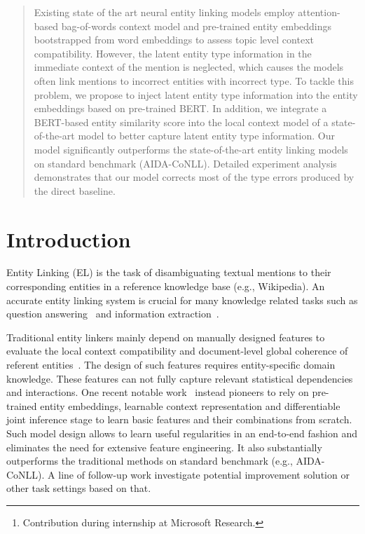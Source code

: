 \documentclass[letterpaper]{article} \usepackage{aaai20}  \usepackage{times}  \usepackage{helvet} \usepackage{courier}  \usepackage[hyphens]{url}  \usepackage{graphicx} \urlstyle{rm} \def\UrlFont{\rm}  \usepackage{graphicx}  \frenchspacing  \setlength{\pdfpagewidth}{8.5in}  \setlength{\pdfpageheight}{11in}  \usepackage{multirow}
\author{Shuang Chen,\textsuperscript{\rm 1}\thanks{Contribution during internship at Microsoft Research.} 
    Jinpeng Wang,\textsuperscript{\rm 2} 
    Feng Jiang,\textsuperscript{\rm 1,3}
    Chin-Yew Lin\textsuperscript{\rm 2} \\
    \textsuperscript{\rm 1} Harbin Institute of Technology, Harbin, China \\
    \textsuperscript{\rm 2} Microsoft Research Asia ~~~~\
    \textsuperscript{\rm 3} Peng Cheng Laboratory \\
    hitercs@gmail.com, \{jinpwa, cyl\}@microsoft.com, fjiang@hit.edu.cn
}
\begin{document}
\maketitle

\begin{abstract}
    Existing state of the art neural entity linking models employ attention-based bag-of-words context model and pre-trained entity embeddings bootstrapped from word embeddings to assess topic level context compatibility. However, the latent entity type information in the immediate context of the mention is neglected, which causes the models often link mentions to incorrect entities with incorrect type. To tackle this problem, we propose to inject latent entity type information into the entity embeddings based on pre-trained BERT. In addition, we integrate a BERT-based entity similarity score into the local context model of a state-of-the-art model to better capture latent entity type information. Our model significantly outperforms the state-of-the-art entity linking models on standard benchmark (AIDA-CoNLL). Detailed experiment analysis demonstrates that our model corrects most of the type errors produced by the direct baseline.
\end{abstract}

\section{Introduction}
Entity Linking (EL) is the task of disambiguating textual mentions to their corresponding entities in a reference knowledge base (e.g., Wikipedia). An accurate entity linking system is crucial for many knowledge related tasks such as question answering~\cite{yih-etal-2015-semantic} and information extraction~\cite{hoffmann-etal-2011-knowledge}.

Traditional entity linkers mainly depend on manually designed features to evaluate the local context compatibility and document-level global coherence of referent entities~\cite{cheng-roth-2013-relational,durrett-klein-2014-joint}. 
The design of such features requires entity-specific domain knowledge. These features can not fully capture relevant statistical dependencies and interactions. 
One recent notable work~\cite{ganea2017deep} instead pioneers to rely on pre-trained entity embeddings, learnable context representation and differentiable joint inference stage to learn basic features and their combinations from scratch. Such model design allows to learn useful regularities in an end-to-end fashion and eliminates the need for extensive feature engineering.
It also substantially outperforms the traditional methods on standard benchmark (e.g., AIDA-CoNLL).
A line of follow-up work \cite{le-titov-2018-improving,le-titov-2019-boosting,le-titov-2019-distant} investigate potential improvement solution or other task settings based on that.
\end{document}

